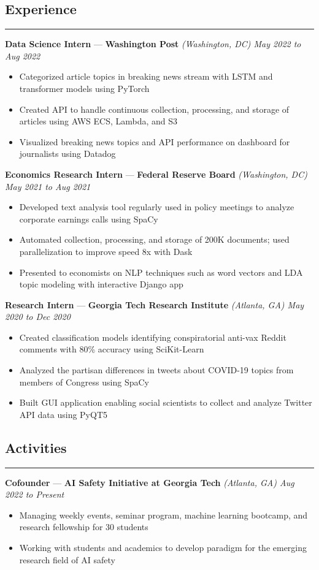 \documentclass[10pt]{article}
\newcommand{\resumeHeading}[1]{
    \subsection*{#1}
    \hrule
    \vspace*{5pt}
}
\newcommand{\resumeSubHeading}[4]{
    \vspace*{5pt}
    \textbf{#1} — \textbf{#2} \textsl{(#3) \hfill #4}
}
\begin{document}

\resumeHeading{Experience \vspace{-2.5pt}}

\resumeSubHeading
    {Data Science Intern}
    {Washington Post}
    {Washington, DC}
    {May 2022 to Aug 2022}
\begin{itemize}
    \item Categorized article topics in breaking news stream with LSTM and transformer models using PyTorch
    \item Created API to handle continuous collection, processing, and storage of articles using AWS ECS, Lambda, and S3
    \item Visualized breaking news topics and API performance on dashboard for journalists using Datadog
\end{itemize}

\resumeSubHeading
    {Economics Research Intern}
    {Federal Reserve Board}
    {Washington, DC}
    {May 2021 to Aug 2021}
\begin{itemize}
    \item Developed text analysis tool regularly used in policy meetings to analyze corporate earnings calls using SpaCy
    \item Automated collection, processing, and storage of 200K documents; used parallelization to improve speed 8x with Dask
    \item Presented to economists on NLP techniques such as word vectors and LDA topic modeling with interactive Django app
\end{itemize}

\resumeSubHeading
    {Research Intern}
    {Georgia Tech Research Institute}
    {Atlanta, GA}
    {May 2020 to Dec 2020}
\begin{itemize}
    \item Created classification models identifying conspiratorial anti-vax Reddit comments with 80\% accuracy using SciKit-Learn
    \item Analyzed the partisan differences in tweets about COVID-19 topics from members of Congress using SpaCy
    \item Built GUI application enabling social scientists to collect and analyze Twitter API data using PyQT5
\end{itemize}



\resumeHeading{Activities}

\resumeSubHeading
    {Cofounder}
    {AI Safety Initiative at Georgia Tech}
    {Atlanta, GA}
    {Aug 2022 to Present}
    \begin{itemize}
        \item Managing weekly events, seminar program, machine learning bootcamp, and research fellowship for 30 students
        \item Working with students and academics to develop paradigm for the emerging research field of AI safety
\end{itemize}
\end{document}
